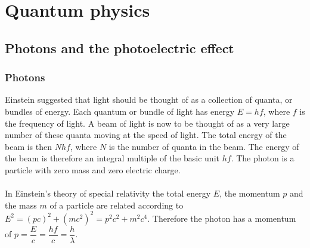 \section{Quantum physics}
\subsection{Photons and the photoelectric effect}
\subsubsection*{Photons}
Einstein suggested that light should be thought of as a collection of quanta, or bundles of energy. Each quantum or bundle of light has energy $E=hf$, where $f$ is the frequency of light. 
A beam of light is now to be thought of as a very large number of these quanta moving at the speed of light. The total energy of the beam is then $Nhf$, where $N$ is the number of quanta in the beam.
The energy of the beam is therefore an integral multiple of the basic unit $hf$. The photon is a particle with zero mass and zero electric charge.\\\\
In Einstein's theory of special relativity the total energy $E$, the momentum $p$ and the mass $m$ of a particle are related according to $E^2=(pc)^2+(mc^2)^2=p^2c^2+m^2c^4$. Therefore the photon has a momentum of $p=\dfrac{E}{c}=\dfrac{hf}{c}=\dfrac{h}{\lambda}$. 
